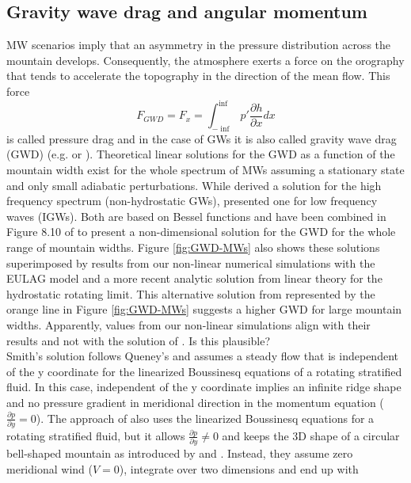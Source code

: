 \subsection*{Gravity wave drag and angular momentum}
MW scenarios imply that an asymmetry in the pressure distribution across the mountain develops. Consequently, the atmosphere exerts a force on the orography that tends to accelerate the topography in the direction of the mean flow. This force  
\begin{equation}
    F_{GWD} = F_x = \int_{-\inf}^{\inf} p' \frac{\partial h}{\partial x} dx
    \label{equ:gwd}
\end{equation}
is called pressure drag and in the case of GWs it is also called gravity wave drag (GWD) (e.g. \cite[]{gill_atmosphere-ocean_1982} or \cite[]{durran_lee_2003}). Theoretical linear solutions for the GWD as a function of the mountain width exist for the whole spectrum of MWs assuming a stationary state and only small adiabatic perturbations. While \textcite[]{blumen_momentum_1965} derived a solution for the high frequency spectrum (non-hydrostatic GWs), \textcite[]{smith_influence_1979} presented one for low frequency waves (IGWs). Both are based on Bessel functions and have been combined in Figure 8.10 of \textcite[]{gill_atmosphere-ocean_1982} to present a non-dimensional solution for the GWD for the whole range of mountain widths. Figure \ref{fig:GWD-MWs} also shows these solutions superimposed by results from our non-linear numerical simulations with the EULAG model and a more recent analytic solution from linear theory for the hydrostatic rotating limit. This alternative solution from \textcite{miranda_non-linear_1992} represented by the orange line in Figure \ref{fig:GWD-MWs} suggests a higher GWD for large mountain widths. Apparently, values from our non-linear simulations align with their results and not with the solution of \textcite[]{smith_influence_1979}. Is this plausible? \\
Smith's solution follows Queney's and assumes a steady flow that is independent of the y coordinate for the linearized Boussinesq equations of a rotating stratified fluid. In this case, independent of the y coordinate implies an infinite ridge shape and no pressure gradient in meridional direction in the momentum equation ($\frac{\partial p}{\partial y}=0$). The approach of \textcite[]{miranda_non-linear_1992} also uses the linearized Boussinesq equations for a rotating stratified fluid, but it allows $\frac{\partial p}{\partial y}\neq 0$ and keeps the 3D shape of a circular bell-shaped mountain as introduced by \textcite[]{smith_linear_1980} and \textcite[]{phillips_analytical_1984}. Instead, they assume zero meridional wind ($V=0$), integrate over two dimensions and end up with 
